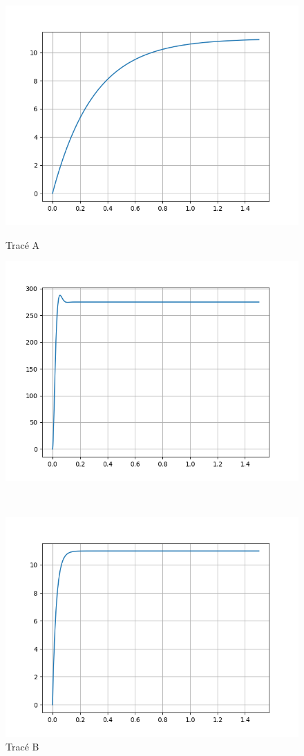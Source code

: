 \begin{figure}[ht!]
\begin{minipage}{0.47\linewidth}
\centering\includegraphics[width=0.95\linewidth]{img/fig13a}
 \caption{Tracé A}
 \label{img13a}
\end{minipage}\hfill
\begin{minipage}{0.47\linewidth}
\centering\includegraphics[width=0.95\linewidth]{img/fig13b}
 \caption{Tracé B}
 \label{img13b}
\end{minipage}\\
\begin{minipage}{0.47\linewidth}
\centering\includegraphics[width=0.95\linewidth]{img/fig13c}

\end{minipage}
\end{figure}

